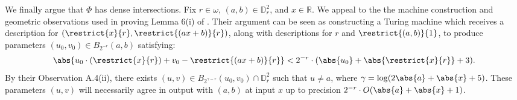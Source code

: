 \begin{example}
    We finally argue that $\Phi$ has dense intersections. Fix $r \in \omega$, $(a, b) \in \mathbb{D}_r^2$, and $x \in \mathbb{R}$. We appeal to the the machine construction and geometric observations used in proving Lemma 6(i) of \cite{LS16}. Their argument can be seen as constructing a Turing machine which receives a description for $(\restrict{x}{r}, \restrict{(ax + b)}{r})$, along with descriptions for $r$ and $\restrict{(a, b)}{1}$, to produce parameters $(u_0, v_0) \in B_{2^{-r}}(a, b)$ satisfying:
    \begin{align*}
        \abs{u_0 \cdot (\restrict{x}{r}) + v_0 - \restrict{(ax + b)}{r}} < 2^{-r} \cdot (\abs{u_0} + \abs{\restrict{x}{r}} + 3).
    \end{align*}
    By their Observation A.4(ii), there exists $(u, v) \in B_{2^{\gamma - r}}(u_0, v_0) \cap \mathbb{D}_r^2$ such that $u \neq a$, where $\gamma = \log(2 \abs{a} + \abs{x} + 5)$. These parameters $(u, v)$ will necessarily agree in output with $(a, b)$ at input $x$ up to precision $2^{-r} \cdot O(\abs{a} + \abs{x} +1)$.
\end{example}




